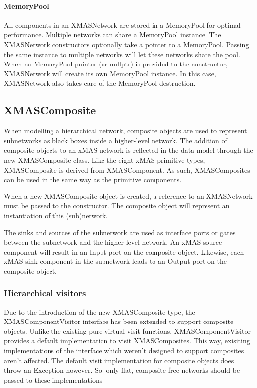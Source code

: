 \paragraph{MemoryPool}
All components in an XMASNetwork are stored in a MemoryPool for optimal performance.
Multiple networks can share a MemoryPool instance. The XMASNetwork constructors
optionally take a pointer to a MemoryPool. Passing the same instance to multiple
networks will let these networks share the pool. When no MemoryPool pointer (or
nullptr) is provided to the constructor, XMASNetwork will create its own
MemoryPool instance. In this case, XMASNetwork also takes care of the MemoryPool
destruction.


\subsection{XMASComposite}

When modelling a hierarchical network, composite objects are used to represent
subnetworks as black boxes inside a higher-level network. The addition of
composite objects to an xMAS network is reflected in the data model through the
new XMASComposite class. Like the eight xMAS primitive types, XMASComposite
is derived from XMASComponent. As such, XMASComposites can be used in the same
way as the primitive components.

When a new XMASComposite object is created, a reference to an XMASNetwork must
be passed to the constructor. The composite object will represent an
instantiation of this (sub)network.

The sinks and sources of the subnetwork are used as interface ports or gates
between the subnetwork and the higher-level network. An xMAS source component
will result in an Input port on the composite object. Likewise, each xMAS sink
component in the subnetwork leads to an Output port on the composite object.

\subsubsection{Hierarchical visitors}

Due to the introduction of the new XMASComposite type, the XMASComponentVisitor
interface has been extended to support composite objects. Unlike the existing
pure virtual visit functions, XMASComponentVisitor provides a default
implementation to visit XMASComposites. This way, exisiting implementations of
the interface which weren't designed to support composites aren't affected. The
default visit implementation for composite objects does throw an Exception however.
So, only flat, composite free networks should be passed to these implementations.

